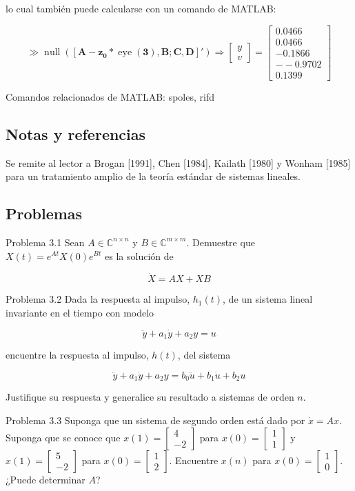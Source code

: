 \documentclass[11pt]{article}
\begin{document}
lo cual también puede calcularse con un comando de MATLAB:

$$
\gg \operatorname{null}\left(\left[\mathbf{A}-\mathbf{z}_{\mathbf{0}} * \operatorname{eye}(\mathbf{3}), \mathbf{B} ; \mathbf{C}, \mathbf{D}\right]'\right) \Longrightarrow\left[\begin{array}{l}
y \\
v
\end{array}\right]=\left[\begin{array}{c}
0.0466 \\
0.0466 \\
-0.1866 \\
--0.9702 \\
0.1399
\end{array}\right]
$$

Comandos relacionados de MATLAB: spoles, rifd

\subsection*{Notas y referencias}
Se remite al lector a Brogan [1991], Chen [1984], Kailath [1980] y Wonham [1985] para un tratamiento amplio de la teoría estándar de sistemas lineales.

\subsection*{Problemas}
Problema 3.1 Sean $A \in \mathbb{C}^{n \times n}$ y $B \in \mathbb{C}^{m \times m}$. Demuestre que $X(t)=e^{A t} X(0) e^{B t}$ es la solución de

$$
\dot{X}=A X+X B
$$

Problema 3.2 Dada la respuesta al impulso, $h_{1}(t)$, de un sistema lineal invariante en el tiempo con modelo

$$
\ddot{y}+a_{1} \dot{y}+a_{2} y=u
$$

encuentre la respuesta al impulso, $h(t)$, del sistema

$$
\ddot{y}+a_{1} \dot{y}+a_{2} y=b_{0} \ddot{u}+b_{1} \dot{u}+b_{2} u
$$

Justifique su respuesta y generalice su resultado a sistemas de orden $n$.

Problema 3.3 Suponga que un sistema de segundo orden está dado por $\dot{x}=A x$. Suponga que se conoce que $x(1)=\left[\begin{array}{c}4 \\ -2\end{array}\right]$ para $x(0)=\left[\begin{array}{l}1 \\ 1\end{array}\right]$ y $x(1)=\left[\begin{array}{c}5 \\ -2\end{array}\right]$ para $x(0)=\left[\begin{array}{l}1 \\ 2\end{array}\right]$. Encuentre $x(n)$ para $x(0)=\left[\begin{array}{l}1 \\ 0\end{array}\right]$. ¿Puede determinar $A$?
\end{document}
